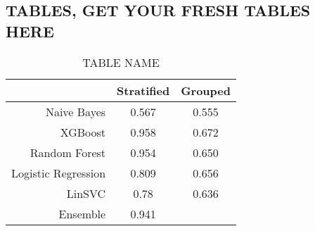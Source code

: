 \subsection{TABLES, GET YOUR FRESH TABLES HERE}
\begin{table}[H]
\begin{center} 
	\begin{tabular}{r|c|c}
		\toprule
		& Stratified & Grouped \\
		\midrule
		Naive Bayes & 0.567 & 0.555 \\
		XGBoost & 0.958 & 0.672 \\
		Random Forest & 0.954 & 0.650 \\
		Logistic Regression & 0.809 & 0.656 \\
		LinSVC & 0.78 & 0.636 \\
		Ensemble & 0.941 & \\
		\bottomrule
	\end{tabular}
\end{center}
\caption{TABLE NAME}
\end{table}
